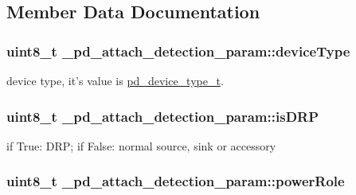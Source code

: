 \subsection{Member Data Documentation}
\hypertarget{struct__pd__attach__detection__param_a935484922f134dd28059b0888fbd416e}{
\subsubsection[{device\-Type}]{\setlength{\rightskip}{0pt plus 5cm}uint8\-\_\-t \-\_\-pd\-\_\-attach\-\_\-detection\-\_\-param\-::device\-Type}}\label{struct__pd__attach__detection__param_a935484922f134dd28059b0888fbd416e}
device type, it's value is \hyperlink{group__usb__pd__stack_gac70b6cd09eeb45ce1aeaa279f44adbc7}{pd\-\_\-device\-\_\-type\-\_\-t}. \hypertarget{struct__pd__attach__detection__param_aa28f1c14440b918b0e10ed04c7483095}{
\subsubsection[{is\-D\-R\-P}]{\setlength{\rightskip}{0pt plus 5cm}uint8\-\_\-t \-\_\-pd\-\_\-attach\-\_\-detection\-\_\-param\-::is\-D\-R\-P}}\label{struct__pd__attach__detection__param_aa28f1c14440b918b0e10ed04c7483095}
if True\-: D\-R\-P; if False\-: normal source, sink or accessory \hypertarget{struct__pd__attach__detection__param_a004647edd5c7e75ce9bd0cc218caf8b1}{
\subsubsection[{power\-Role}]{\setlength{\rightskip}{0pt plus 5cm}uint8\-\_\-t \-\_\-pd\-\_\-attach\-\_\-detection\-\_\-param\-::power\-Role}}\label{struct__pd__attach__detection__param_a004647edd5c7e75ce9bd0cc218caf8b1}


